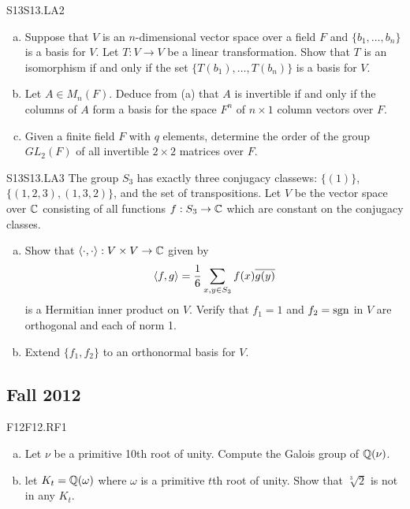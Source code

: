 \documentclass[../AlgebraQualSolutions.tex]{subfiles}
\begin{document}
\begin{prob}{S13}{S13.LA2}

	\begin{enumerate}[(a)]
		\item Suppose that $V$ is an $n$-dimensional vector space over a field $F$ and $\{b_1, \ldots, b_n\}$ is a basis for $V$. Let $T: V \to V$ be a linear transformation. Show that $T$ is an isomorphism if and only if the set $\{T(b_1), \ldots, T(b_n)\}$ is a basis for $V$.
		\item Let $A \in M_n(F)$. Deduce from (a) that $A$ is invertible if and only if the columns of $A$ form a basis for the space $F^n$  of $n \times 1$ column vectors over $F$.
		\item Given a finite field $F$ with $q$ elements, determine the order of the group $GL_2(F)$ of all invertible $2 \times 2$ matrices over $F$.
	\end{enumerate}
\end{prob}

\begin{prob}{S13}{S13.LA3}
The group $S_3$ has exactly three conjugacy classews: $\{(1)\}$, $\{(1,2,3), (1,3,2)\}$, and the set of transpositions. Let $V$ be the vector space over $\mathbb{C}$ consisting of all functions $f:S_3 \to \mathbb{C}$ which are constant on the conjugacy classes.
	\begin{enumerate}[(a)]
		\item Show that $\langle \cdot, \cdot\rangle: V \times V \to \mathbb{C}$ given by 
			\[\langle f, g\rangle = \frac{1}{6} \sum_{x,y \in S_3} f(x) \overline{g(y)}\]
		is a Hermitian inner product on $V$. Verify that $f_1 = 1$ and $f_2 = \rm{sgn}$ in $V$ are orthogonal and each of norm 1. 
	\item Extend $\{f_1, f_2\}$ to an orthonormal basis for $V$.
	\end{enumerate}
\end{prob}


\subsection{Fall 2012}

\begin{prob}{F12}{F12.RF1}
\begin{enumerate}[(a)]
\item Let $\nu$ be a primitive 10th root of unity. Compute the Galois group of $\mathbb{Q}(\nu)$.
\item let $K_t = \mathbb{Q}(\omega)$ where $\omega$ is a primitive $t$th root of unity. Show that $\sqrt[3]{2}$ is not in any $K_t$.
\end{enumerate}
\end{prob}
\end{document}
